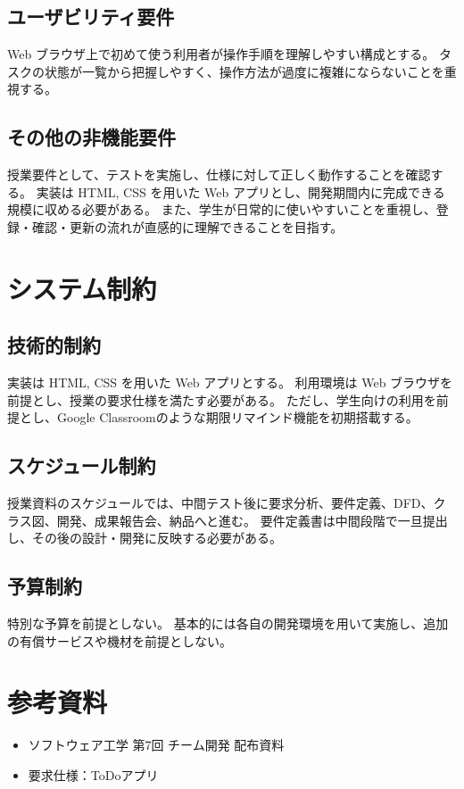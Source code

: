 \documentclass[dvipdfmx,10pt]{jarticle}
\begin{document}
    \subsection{ユーザビリティ要件}
    Web ブラウザ上で初めて使う利用者が操作手順を理解しやすい構成とする。
    タスクの状態が一覧から把握しやすく、操作方法が過度に複雑にならないことを重視する。

    \subsection{その他の非機能要件}
    授業要件として、テストを実施し、仕様に対して正しく動作することを確認する。
    実装は HTML, CSS を用いた Web アプリとし、開発期間内に完成できる規模に収める必要がある。
    また、学生が日常的に使いやすいことを重視し、登録・確認・更新の流れが直感的に理解できることを目指す。

    \pagebreak

    \section{システム制約}
    \label{sec:constraints}
    \subsection{技術的制約}
    実装は HTML, CSS を用いた Web アプリとする。
    利用環境は Web ブラウザを前提とし、授業の要求仕様を満たす必要がある。
    ただし、学生向けの利用を前提とし、Google Classroomのような期限リマインド機能を初期搭載する。

    \subsection{スケジュール制約}
    授業資料のスケジュールでは、中間テスト後に要求分析、要件定義、DFD、クラス図、開発、成果報告会、納品へと進む。
    要件定義書は中間段階で一旦提出し、その後の設計・開発に反映する必要がある。

    \subsection{予算制約}
    特別な予算を前提としない。
    基本的には各自の開発環境を用いて実施し、追加の有償サービスや機材を前提としない。

    \pagebreak
    
    \section{参考資料}
    \begin{itemize}
        \item ソフトウェア工学 第7回 チーム開発 配布資料
        \item 要求仕様：ToDoアプリ
    \end{itemize}
\end{document}
